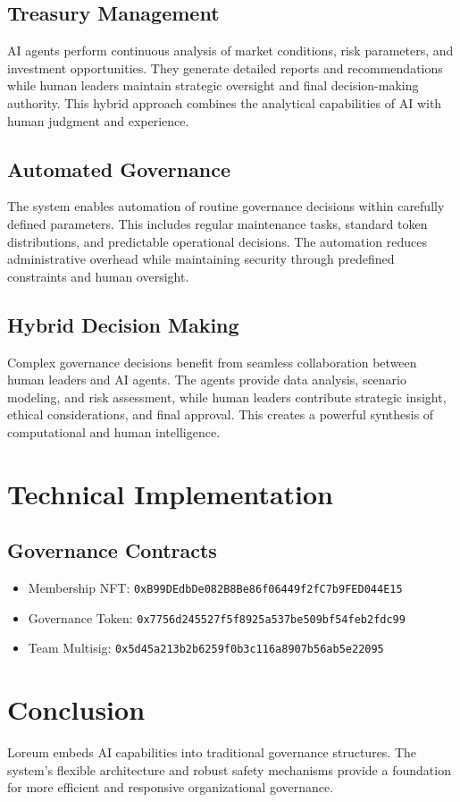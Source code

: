 \documentclass[12pt]{article}
\begin{document}
\subsection{Treasury Management}
AI agents perform continuous analysis of market conditions, risk parameters, and investment opportunities. They generate detailed reports and recommendations while human leaders maintain strategic oversight and final decision-making authority. This hybrid approach combines the analytical capabilities of AI with human judgment and experience.

\subsection{Automated Governance}
The system enables automation of routine governance decisions within carefully defined parameters. This includes regular maintenance tasks, standard token distributions, and predictable operational decisions. The automation reduces administrative overhead while maintaining security through predefined constraints and human oversight.

\subsection{Hybrid Decision Making}
Complex governance decisions benefit from seamless collaboration between human leaders and AI agents. The agents provide data analysis, scenario modeling, and risk assessment, while human leaders contribute strategic insight, ethical considerations, and final approval. This creates a powerful synthesis of computational and human intelligence.

\section{Technical Implementation}

\subsection{Governance Contracts}
\begin{itemize}
    \item Membership NFT: \texttt{0xB99DEdbDe082B8Be86f06449f2fC7b9FED044E15}
    \item Governance Token: \texttt{0x7756d245527f5f8925a537be509bf54feb2fdc99}
    \item Team Multisig: \texttt{0x5d45a213b2b6259f0b3c116a8907b56ab5e22095}
\end{itemize}

\section{Conclusion}
Loreum embeds AI capabilities into traditional governance structures. The system's flexible architecture and robust safety mechanisms provide a foundation for more efficient and responsive organizational governance.
\end{document}
